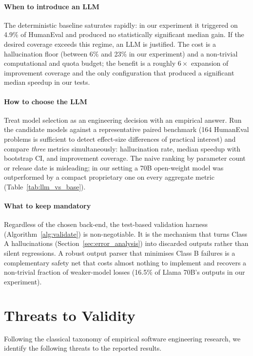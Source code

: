 \documentclass[conference]{IEEEtran}
\begin{document}
\paragraph{When to introduce an LLM} The deterministic baseline saturates rapidly: in our experiment it triggered on 4.9\% of HumanEval and produced no statistically significant median gain. If the desired coverage exceeds this regime, an LLM is justified. The cost is a hallucination floor (between 6\% and 23\% in our experiment) and a non-trivial computational and quota budget; the benefit is a roughly $6\times$ expansion of improvement coverage and the only configuration that produced a significant median speedup in our tests.

\paragraph{How to choose the LLM} Treat model selection as an engineering decision with an empirical answer. Run the candidate models against a representative paired benchmark (164 HumanEval problems is sufficient to detect effect-size differences of practical interest) and compare \emph{three} metrics simultaneously: hallucination rate, median speedup with bootstrap CI, and improvement coverage. The naive ranking by parameter count or release date is misleading; in our setting a 70B open-weight model was outperformed by a compact proprietary one on every aggregate metric (Table~\ref{tab:llm_vs_base}).

\paragraph{What to keep mandatory} Regardless of the chosen back-end, the test-based validation harness (Algorithm~\ref{alg:validate}) is non-negotiable. It is the mechanism that turns Class A hallucinations (Section~\ref{sec:error_analysis}) into discarded outputs rather than silent regressions. A robust output parser that minimises Class B failures is a complementary safety net that costs almost nothing to implement and recovers a non-trivial fraction of weaker-model losses (16.5\% of Llama 70B's outputs in our experiment).

\section{Threats to Validity}
\label{sec:ameacas}

Following the classical taxonomy of empirical software engineering research, we identify the following threats to the reported results.
\end{document}
